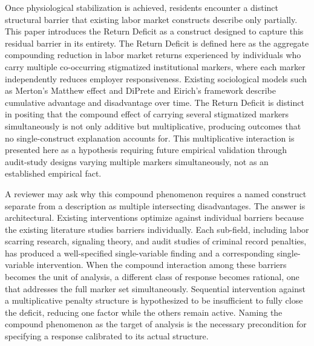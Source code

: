 \documentclass[12pt, letterpaper]{article}
\begin{document}
Once physiological stabilization is achieved, residents encounter a distinct structural barrier that existing labor market constructs describe only partially. This paper introduces the Return Deficit as a construct designed to capture this residual barrier in its entirety. The Return Deficit is defined here as the aggregate compounding reduction in labor market returns experienced by individuals who carry multiple co-occurring stigmatized institutional markers, where each marker independently reduces employer responsiveness. Existing sociological models such as Merton's Matthew effect and DiPrete and Eirich's framework \citep{diprete2006cumulative} describe cumulative advantage and disadvantage over time. The Return Deficit is distinct in positing that the compound effect of carrying several stigmatized markers simultaneously is not only additive but multiplicative, producing outcomes that no single-construct explanation accounts for. This multiplicative interaction is presented here as a hypothesis requiring future empirical validation through audit-study designs varying multiple markers simultaneously, not as an established empirical fact.

A reviewer may ask why this compound phenomenon requires a named construct separate from a description as multiple intersecting disadvantages. The answer is architectural. Existing interventions optimize against individual barriers because the existing literature studies barriers individually. Each sub-field, including labor scarring research, signaling theory, and audit studies of criminal record penalties, has produced a well-specified single-variable finding and a corresponding single-variable intervention. When the compound interaction among these barriers becomes the unit of analysis, a different class of response becomes rational, one that addresses the full marker set simultaneously. Sequential intervention against a multiplicative penalty structure is hypothesized to be insufficient to fully close the deficit, reducing one factor while the others remain active. Naming the compound phenomenon as the target of analysis is the necessary precondition for specifying a response calibrated to its actual structure.
\end{document}
